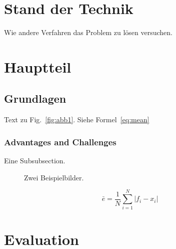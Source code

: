 \documentclass{llncs}
\begin{document}
\section{Stand der Technik} \label{sec:sdt}
%
Wie andere Verfahren das Problem zu lösen versuchen. \cite{OCBible}

\section{Hauptteil}
\label{sec:Hauptteil}

\subsection{Grundlagen}
\label{sec:Grundlagen}
Text zu Fig.~\ref{fig:abb1}. Siehe Formel~\ref{eq:mean}

\subsubsection{Advantages and Challenges}
Eine Subsubsection.


\begin{figure}
	\centering
	\hfill
	\caption{Zwei Beispielbilder.}
\end{figure}

\begin{equation}
\label{eq:mean}
\bar{e} = \frac{1}{N}\sum_{i=1}^N{\lvert f_i - x_i\rvert}
\end{equation}


\section{Evaluation}
\end{document}
